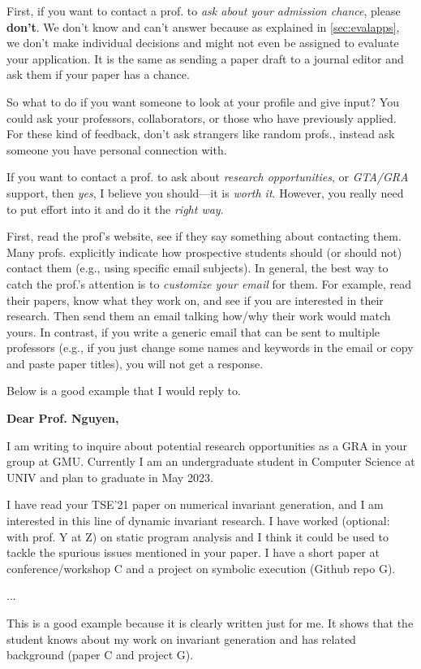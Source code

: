 \documentclass[oneside,11pt]{memoir}
\newenvironment{commentbox}[1][]{
  \small
  \begin{mybox}
    {\small \textbf{#1}}
  }{
  \end{mybox}
}
\begin{document}
First, if you want to contact a prof. to \emph{ask about your admission chance}, please \textbf{don't}. We don't know and can't answer because as explained in \autoref{sec:evalapps}, we don't make individual decisions and might not even be assigned to evaluate your application.  It is the same as sending a paper draft to a journal editor and ask them if your paper has a chance.

So what to do if you want someone to look at your profile and give input? You could ask your professors, collaborators, or those who have previously applied. For these kind of feedback,  don't ask strangers like random profs., instead ask someone you have personal connection with.  

If you want to contact a prof. to ask about \emph{research opportunities}, or \emph{GTA/GRA} support, then \emph{yes}, I believe you should---it is \emph{worth it}. However, you really need to put effort into it and do it the \emph{right way}.

First, read the prof's website, see if they say something about contacting them. Many profs. explicitly indicate how prospective students should (or should not) contact them (e.g., using specific email subjects).
In general, the best way to catch the prof.'s attention is to \emph{customize your email} for them.  For example, read their papers, know what they work on, and see if you are interested in their research. Then send them an email talking how/why their work would match yours.
In contrast, if you write a generic email that can be sent to multiple professors (e.g., if you just change some names and keywords in the email or copy and paste paper titles), you will not get a response.

Below is a good example that I would reply to.   

\begin{commentbox}[Dear Prof. Nguyen,]

  I am writing to inquire about potential research opportunities as a GRA in your group at GMU. Currently I am an undergraduate student in Computer Science at UNIV and plan to graduate in May 2023.


  I have read your TSE'21 paper on numerical invariant generation, and I am interested in this line of dynamic invariant research. I have worked (optional: with prof. Y at Z) on static program analysis and I think it could be used to tackle the spurious issues mentioned in your paper. I have a short paper at conference/workshop C and a project on symbolic execution (Github repo G).

  ...

  This is a good example because it is clearly written just for me.  It shows that the student knows about my work on invariant generation and has related  background (paper C and project G).
\end{commentbox}
\end{document}
